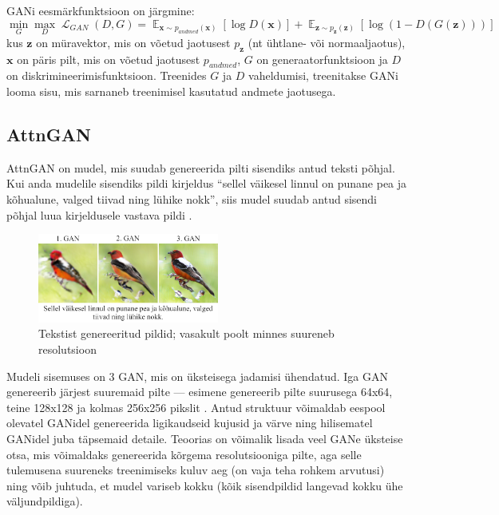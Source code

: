 \documentclass{vilgym}
\DeclareMathOperator{\EX}{\mathbb{E}}
\DeclareMathOperator{\loss}{\mathcal{L}}
\begin{document}
	GANi eesmärkfunktsioon on järgmine:
	\begin{equation} \label{eq:gan}
		\operatorname*{min}_G \operatorname*{max}_D \loss_{GAN}(D,G) = \EX_{\boldsymbol{x}\sim p_{andmed}(\boldsymbol{x})}[\log D(\boldsymbol{x})] + \EX_{\boldsymbol{z}\sim p_{\boldsymbol{z}}(\boldsymbol{z})}[\log(1-D(G(\boldsymbol{z})))]
	\end{equation}
	kus $ \boldsymbol{z} $ on müravektor, mis on võetud jaotusest $ p_{\boldsymbol{z}} $ (nt ühtlane- või normaaljaotus), $ \boldsymbol{x} $ on päris pilt, mis on võetud jaotusest $ p_{andmed} $, $ G $ on generaatorfunktsioon ja $ D $ on diskrimineerimisfunktsioon. Treenides $ G $ ja $ D $ vaheldumisi, treenitakse GANi looma sisu, mis sarnaneb treenimisel kasutatud andmete jaotusega. \parencite{gan}

	\subsection{AttnGAN}

	AttnGAN on mudel, mis suudab genereerida pilti sisendiks antud teksti põhjal. Kui anda mudelile sisendiks pildi kirjeldus \enquote{sellel väikesel linnul on punane pea ja kõhualune, valged tiivad ning lühike nokk}, siis mudel suudab antud sisendi põhjal luua kirjeldusele vastava pildi .
	
	\begin{figure}
		\includegraphics[width=0.53\textwidth]{images/attngan.png}
		\caption{Tekstist genereeritud pildid; vasakult poolt minnes suureneb resolutsioon}
		\label{fig:attngan}
	\end{figure}

	Mudeli sisemuses on 3 GAN, mis on üksteisega jadamisi ühendatud. Iga GAN genereerib järjest suuremaid pilte --- esimene genereerib pilte suurusega 64x64, teine 128x128 ja kolmas 256x256 pikslit . Antud struktuur võimaldab eespool olevatel GANidel genereerida ligikaudseid kujusid ja värve ning hilisematel GANidel juba täpsemaid detaile. Teoorias on võimalik lisada veel GANe üksteise otsa, mis võimaldaks genereerida kõrgema resolutsiooniga pilte, aga selle tulemusena suureneks treenimiseks kuluv aeg (on vaja teha rohkem arvutusi) ning võib juhtuda, et mudel variseb kokku (kõik sisendpildid langevad kokku ühe väljundpildiga).
\end{document}
